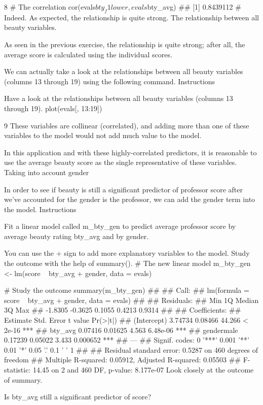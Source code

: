 8
# The correlation
cor(evals$bty_f1lower, evals$bty_avg)
## [1] 0.8439112
# Indeed. As expected, the relationship is quite strong.
The relationship between all beauty variables.

As seen in the previous exercise, the relationship is quite strong; 
after all, the average score is calculated using the individual scores. 

We can actually take a look at the relationships between all beauty variables 
(columns 13 through 19) using the following command.
Instructions

Have a look at the relationships between all beauty variables (columns 13 through 19).
plot(evals[, 13:19])

9
These variables are collinear (correlated), and adding more than one of these variables
to the model would not add much value to the model. 

In this application and with these highly-correlated predictors, it is reasonable to use
the average beauty score as the single representative of these variables.
Taking into account gender

In order to see if beauty is still a significant predictor of professor score after we've
accounted for the gender is the professor, we can add the gender term into the model.
Instructions

Fit a linear model called m_bty_gen to predict average professor score by average beauty
rating bty_avg and by gender. 

You can use the + sign to add more explanatory variables to the model.
Study the outcome with the help of summary().
# The new linear model
m_bty_gen <- lm(score ~ bty_avg + gender, data = evals)

# Study the outcome
summary(m_bty_gen)
## 
## Call:
## lm(formula = score ~ bty_avg + gender, data = evals)
## 
## Residuals:
##     Min      1Q  Median      3Q     Max 
## -1.8305 -0.3625  0.1055  0.4213  0.9314 
## 
## Coefficients:
##             Estimate Std. Error t value Pr(>|t|)    
## (Intercept)  3.74734    0.08466  44.266  < 2e-16 ***
## bty_avg      0.07416    0.01625   4.563 6.48e-06 ***
## gendermale   0.17239    0.05022   3.433 0.000652 ***
## ---
## Signif. codes:  0 '***' 0.001 '**' 0.01 '*' 0.05 '.' 0.1 ' ' 1
## 
## Residual standard error: 0.5287 on 460 degrees of freedom
## Multiple R-squared:  0.05912,    Adjusted R-squared:  0.05503 
## F-statistic: 14.45 on 2 and 460 DF,  p-value: 8.177e-07
Look closely at the outcome of summary. 

Is bty_avg still a significant predictor of score?

